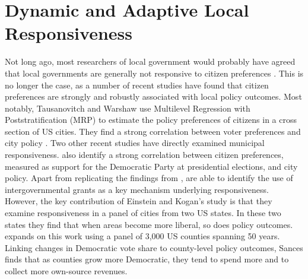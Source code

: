 \documentclass[a4paper,12pt]{article}
\begin{document}
\section*{Dynamic and Adaptive Local Responsiveness}

 Not long ago, most researchers of local government would probably have agreed that local governments are generally not responsive to citizen preferences \citep{peterson1981city}. This is no longer the case, as a number of recent studies have found that citizen preferences are strongly and robustly associated with local policy outcomes. Most notably, Tausanovitch and Warshaw use Multilevel Regression with Poststratification (MRP) to estimate the policy preferences of citizens in a cross section of US cities. They find a strong correlation between voter preferences and city policy \citep[for earlier efforts, see ][]{hajnal2010or,palus2010responsiveness}. Two other recent studies have directly examined municipal responsiveness. \cite{einstein2016pushing} also identify a strong correlation between citizen preferences, measured as support for the Democratic Party at presidential elections,  and city policy. Apart from replicating the findings from \citeauthor{tausanovitch2014representation}, \citeauthor{einstein2016pushing} are able to identify the use of intergovernmental grants as a key mechanism underlying responsiveness. However, the key contribution of Einstein and Kogan's study is that they examine responsiveness in a panel of cities from two US states. In these two states they find that when areas become more liberal, so does policy outcomes. \citet{sances2017voters} expands on this work using a panel of 3,000 US counties spanning 50 years. Linking changes in Democratic vote share to county-level policy outcomes, Sances finds that as counties grow more Democratic, they tend to spend more and to collect more own-source revenues.
 
\end{document}
